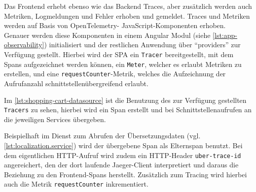 Das Frontend erhebt ebenso wie das Backend Traces, aber zusätzlich werden auch Metriken, Logmeldungen und Fehler erhoben und gemeldet. Traces und Metriken werden auf Basis von OpenTelemetry- JavaScript-Komponenten \cite{OpenTelemetryJS} erhoben. Genauer werden diese Komponenten in einem Angular Modul (siehe \autoref{lst:app-observability}) initialisiert und der restlichen Anwendung über \enquote{providers} zur Verfügung gestellt. Hierbei wird der SPA ein \texttt{Tracer} bereitgestellt, mit dem Spans aufgezeichnet werden können, ein \texttt{Meter}, welcher es erlaubt Metriken zu erstellen, und eine \texttt{requestCounter}-Metrik, welches die Aufzeichnung der Aufrufanzahl schnittstellenübergreifend erlaubt.



Im \autoref{lst:shopping-cart-datasource} ist die Benutzung des zur Verfügung gestellten \texttt{Tracers} zu sehen, hierbei wird ein Span erstellt und bei Schnittstellenaufrufen an die jeweiligen Services übergeben.



Beispielhaft im Dienst zum Abrufen der Übersetzungsdaten (vgl. \autoref{lst:localization.service}) wird der übergebene Span als Elternspan benutzt. Bei dem eigentlichen HTTP-Aufruf wird zudem ein HTTP-Header \texttt{uber-trace-id} angereichert, den der dort laufende Jaeger-Client interpretiert \cite{JaegerClient} und daraus die Beziehung zu den Frontend-Spans herstellt. Zusätzlich zum Tracing wird hierbei auch die Metrik \texttt{requestCounter} inkrementiert.



